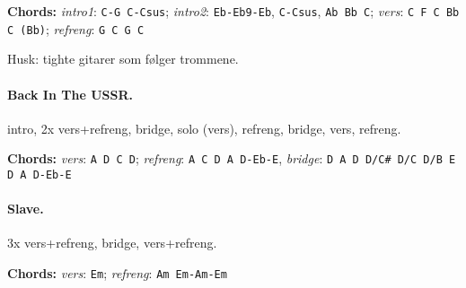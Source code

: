 \documentclass[%
twoside,                 %
final,                   %
10pt]{article}
\begin{document}
\textbf{Chords:} \emph{intro1}: \Verb!C-G C-Csus!; \emph{intro2}: \Verb!Eb-Eb9-Eb!, \Verb!C-Csus!, \Verb!Ab Bb C!;
\emph{vers}: \Verb!C F C Bb C (Bb)!; \emph{refreng}: \Verb!G C G C!

Husk: tighte gitarer som følger trommene.




\paragraph{Back In The USSR.}
intro, 2x vers+refreng, bridge, solo (vers), refreng, bridge, vers, refreng.

\textbf{Chords:} \emph{vers}: \Verb!A D C D!; \emph{refreng}: \Verb!A C D A D-Eb-E!,
\emph{bridge}: \Verb!D A D D/C# D/C D/B E D A D-Eb-E!





\paragraph{Slave.}
3x vers+refreng, bridge, vers+refreng.

\textbf{Chords:} \emph{vers}: \Verb!Em!; \emph{refreng}: \Verb!Am Em-Am-Em!








\printindex
\end{document}
